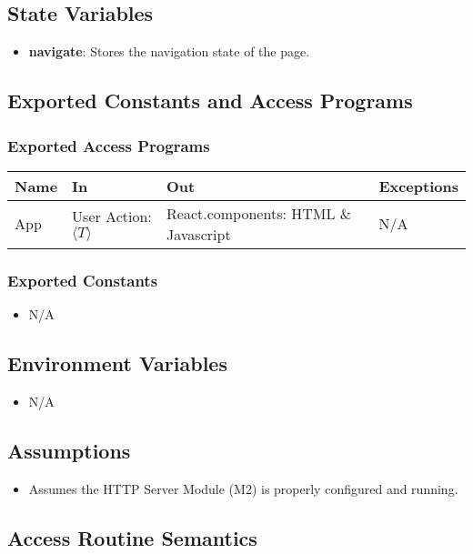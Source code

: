 \documentclass[12pt, titlepage]{article}
\begin{document}
\subsection{State Variables}
\begin{itemize}
    \item \textbf{navigate}: Stores the navigation state of the page.
\end{itemize}
\subsection{Exported Constants and Access Programs}
\subsubsection{Exported Access Programs}

\begin{tabular}{|l|l|l|l|}
    \hline
    \textbf{Name} & \textbf{In} & \textbf{Out} & \textbf{Exceptions} \\
    \hline
    App & User Action: $\langle T \rangle$ & React.components: HTML \& Javascript & N/A \\
    \hline
\end{tabular}

\subsubsection{Exported Constants}
\begin{itemize}
    \item N/A
\end{itemize}
\subsection{Environment Variables}
\begin{itemize}
  \item N/A
\end{itemize}
\subsection{Assumptions}
\begin{itemize}
  \item Assumes the HTTP Server Module (M2) is properly configured and running.
\end{itemize}
\subsection{Access Routine Semantics}
\end{document}
